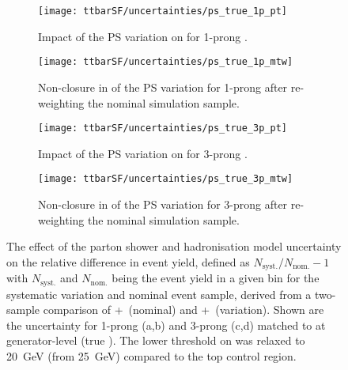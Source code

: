 \begin{figure}[htbp]
  \centering

  \begin{subfigure}[t]{.48\textwidth}
    \texttt{[image: ttbarSF/uncertainties/ps\_true\_1p\_pt]}
    \caption{Impact of the PS variation on \tauhadvis \pT for 1-prong
      \tauhadvis.}
    \label{fig:ttbarSF_uncertainty_ps_1p_pt}
  \end{subfigure}\hfill%
  \begin{subfigure}[t]{.48\textwidth}
    \texttt{[image: ttbarSF/uncertainties/ps\_true\_1p\_mtw]}
    \caption{Non-closure in \mTW of the PS variation for 1-prong
      \tauhadvis after re-weighting the nominal simulation sample.}
    \label{fig:ttbarSF_uncertainty_ps_1p_mtw}
  \end{subfigure}

  \vspace{0.5em}

  \begin{subfigure}[t]{.48\textwidth}
    \texttt{[image: ttbarSF/uncertainties/ps\_true\_3p\_pt]}
    \caption{Impact of the PS variation on \tauhadvis \pT for 3-prong
      \tauhadvis.}
    \label{fig:ttbarSF_uncertainty_ps_3p_pt}
  \end{subfigure}\hfill%
  \begin{subfigure}[t]{.48\textwidth}
    \texttt{[image: ttbarSF/uncertainties/ps\_true\_3p\_mtw]}
    \caption{Non-closure in \mTW of the PS variation for 3-prong
      \tauhadvis after re-weighting the nominal simulation sample.}
    \label{fig:ttbarSF_uncertainty_ps_3p_mtw}
  \end{subfigure}

  \caption{The effect of the parton shower and hadronisation model
    uncertainty on the relative difference in event yield, defined as
    $N_{\text{syst.}} / N_{\text{nom.}} - 1$ with $N_{\text{syst.}}$
    and $N_{\text{nom.}}$ being the event yield in a given bin for the
    systematic variation and nominal event sample, derived from a
    two-sample comparison of \POWHEGBOX[v2]+~\PYTHIA[8] (nominal) and
    \POWHEGBOX[v2]+~\HERWIG[7] (variation). Shown are the uncertainty
    for 1-prong (a,b) and 3-prong (c,d) \tauhadvis matched to \tauhad
    at generator-level (true \tauhadvis). The lower threshold on
    \tauhadvis \pT was relaxed to \SI{20}{\GeV} (from \SI{25}{\GeV})
    compared to the top control region.}%
  \label{fig:ttbarSF_uncertainty_ps}
\end{figure}

